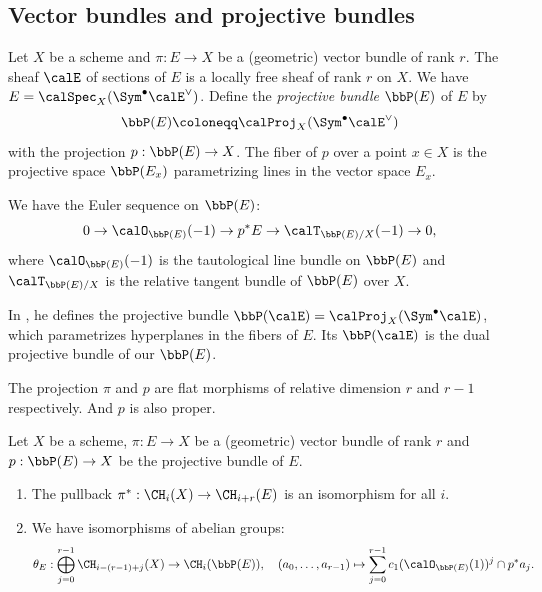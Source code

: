 \subsection{Vector bundles and projective bundles}

  Let $X$ be a scheme and $\pi:E \to X$ be a (geometric) vector bundle of rank $r$.
  The sheaf $\calE$ of sections of $E$ is a locally free sheaf of rank $r$ on $X$.
  We have $E = \calSpec_X(\Sym^\bullet \calE^\vee)$.
  Define the \emph{projective bundle} $\bbP(E)$ of $E$ by 
  \[ \bbP(E) \coloneqq \calProj_X(\Sym^\bullet \calE^\vee) \]
  with the projection $p:\bbP(E) \to X$.
  The fiber of $p$ over a point $x \in X$ is the projective space $\bbP(E_x)$ parametrizing lines in the vector space $E_x$.

  We have the Euler sequence on $\bbP(E)$:
  \[ 0 \to \calO_{\bbP(E)}(-1) \to p^*E \to \calT_{\bbP(E)/X}(-1) \to 0, \]
  where $\calO_{\bbP(E)}(-1)$ is the tautological line bundle on $\bbP(E)$ and $\calT_{\bbP(E)/X}$ is the relative tangent bundle of $\bbP(E)$ over $X$.

  \begin{remark}
    In \cite{Har77}, he defines the projective bundle $\bbP(\calE) = \calProj_X(\Sym^\bullet \calE)$, which parametrizes hyperplanes in the fibers of $E$.
    Its $\bbP(\calE)$ is the dual projective bundle of our $\bbP(E)$.
  \end{remark}

  \begin{remark}
    The projection $\pi$ and $p$ are flat morphisms of relative dimension $r$ and $r-1$ respectively.
    And $p$ is also proper.
  \end{remark}

  \begin{theorem}\label{thm:Chow_group_of_vector_and_projective_bundle}
    Let $X$ be a scheme, $\pi: E \to X$ be a (geometric) vector bundle of rank $r$ and $p: \bbP(E) \to X$ be the projective bundle of $E$.
    \begin{enumerate}
      \item The pullback $\pi^*: \CH_i(X) \to \CH_{i+r}(E)$ is an isomorphism for all $i$.
      \item We have isomorphisms of abelian groups:
        \[\theta_E : \bigoplus_{j=0}^{r-1} \CH_{i-(r-1)+j}(X) \to \CH_i(\bbP(E)), \quad (a_0, \ldots, a_{r-1}) \mapsto \sum_{j=0}^{r-1} c_1(\calO_{\bbP(E)}(1))^j \cap p^*a_j. \]
    \end{enumerate}
  \end{theorem}

